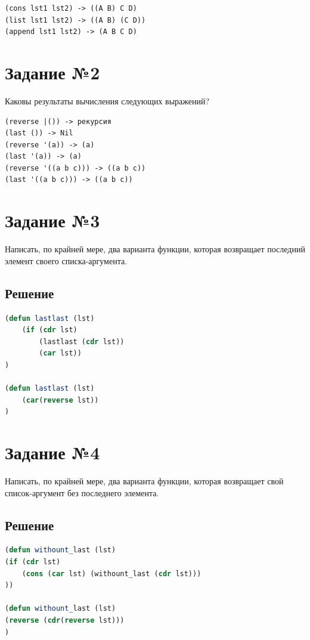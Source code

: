 \documentclass[12pt]{report}
\begin{document}
\begin{lstlisting}
(cons lst1 lst2) -> ((A B) C D)
(list lst1 lst2) -> ((A B) (C D))
(append lst1 lst2) -> (A B C D)
\end{lstlisting}

\section*{Задание №2}
Каковы результаты вычисления следующих выражений?

\begin{lstlisting}
(reverse |()) -> рекурсия
(last ()) -> Nil
(reverse '(a)) -> (a)
(last '(a)) -> (a)
(reverse '((a b c))) -> ((a b c))
(last '((a b c))) -> ((a b c))

\end{lstlisting}


\section*{Задание №3}
Написать, по крайней мере, два варианта функции, которая возвращает последний элемент своего списка-аргумента.
\subsection*{Решение}
\begin{lstlisting}[label=third,caption=Решение задания №3, language=lisp]
(defun lastlast (lst)
	(if (cdr lst)
		(lastlast (cdr lst))
		(car lst))
)

(defun lastlast (lst)
	(car(reverse lst))
)
\end{lstlisting}

\section*{Задание №4}
Написать, по крайней мере, два варианта функции, которая возвращает свой список-аргумент без последнего элемента.

\subsection*{Решение}
\begin{lstlisting}[label=third,caption=Решение задания №4, language=lisp]
(defun withount_last (lst) 
(if (cdr lst)
    (cons (car lst) (withount_last (cdr lst)))
))

(defun withount_last (lst)
(reverse (cdr(reverse lst)))
)
\end{lstlisting}
\end{document}
